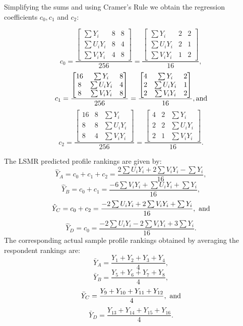 \documentclass[a4paper, 12pt]{article}
\begin{document}
{\flushleft Simplifying} the sums and using Cramer's Rule  we obtain the regression coefficients $c_0,c_1$ and $c_2$:

$$
c_0 =
\frac{
	\begin{bmatrix}
	\sum Y_i & 8 & 8\\
	\sum U_iY_i& 8 & 4\\
	\sum V_iY_i & 4 & 8
	\end{bmatrix}
}{256} = \frac{
	\begin{bmatrix}
	\sum Y_i & 2 & 2\\
	\sum U_iY_i& 2 & 1\\
	\sum V_iY_i & 1 & 2
	\end{bmatrix}
}{16},
$$
$$
c_1 =
\frac{
	\begin{bmatrix}
	16 & \sum Y_i & 8 \\
	8 & \sum U_iY_i& 4\\
	8 & \sum V_iY_i & 8
	\end{bmatrix}
}{256} = \frac{
	\begin{bmatrix}
	4 & \sum Y_i & 2 \\
	2 & \sum U_iY_i& 1\\
	2 & \sum V_iY_i & 2
	\end{bmatrix}
}{16}, \textup{and}
$$
$$
c_2 =
\frac{
	\begin{bmatrix}
	16 &  8 & \sum Y_i\\
	8 & 8 & \sum U_iY_i \\
	8 & 4 & \sum V_iY_i
	\end{bmatrix}
}{256} = \frac{
	\begin{bmatrix}
	4 & 2 & \sum Y_i\\
	2 & 2 & \sum U_iY_i \\
	2 & 1 & \sum V_iY_i
	\end{bmatrix}
}{16}.
$$

The LSMR predicted profile rankings  are given by:
$$\hat{Y}_{A} = c_0 + c_1 + c_2 =
\frac{2\sum U_iY_i + 2\sum V_iY_i - \sum Y_i}{16},$$
$$\hat{Y}_{B} = c_0 + c_1 =
\frac{-6 \sum V_iY_i + \sum U_iY_i + \sum Y_i}{16},$$
$$\hat{Y}_{C} = c_0 + c_2 =
\frac{-2\sum U_iY_i + 2\sum V_iY_i + \sum Y_i}{16}, \textup{  and}$$
$$\hat{Y}_{D} = c_0 =
\frac{-2\sum U_iY_i - 2\sum V_iY_i +3 \sum Y_i}{16}.$$
The corresponding actual sample profile rankings obtained by averaging the respondent rankings are:
$$\bar{Y}_{A} = \frac{Y_1+Y_2+Y_3+Y_4}{4},$$
$$\bar{Y}_{B} = \frac{Y_5+Y_6+Y_7+Y_8}{4},$$
$$\bar{Y}_{C} = \frac{Y_9+Y_{10}+Y_{11}+Y_{12}}{4}, \textup{  and}$$
$$\bar{Y}_{D} = \frac{Y_{13}+Y_{14}+Y_{15}+Y_{16}}{4}.$$
\end{document}

